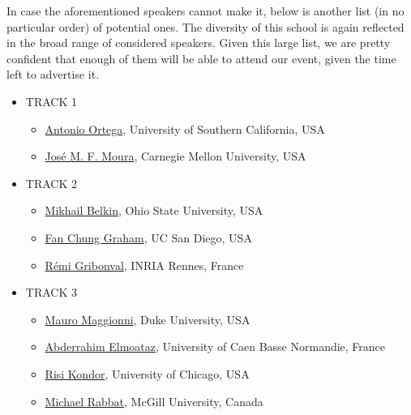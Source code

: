 \documentclass[a4paper]{scrartcl}
\begin{document}
In case the aforementioned speakers cannot make it, below is another list (in no
particular order) of potential ones. The diversity of this school is again
reflected in the broad range of considered speakers. Given this large list, we
are pretty confident that enough of them will be able to attend our event, given
the time left to advertise it.
\begin{itemize}
\setlength{\itemsep}{0pt} \setlength{\parskip}{0pt}
\item TRACK 1
	\begin{itemize}
	\setlength{\itemsep}{0pt} \setlength{\parskip}{0pt}
	\item \href{http://ee.usc.edu/faculty_staff/faculty_directory/ortega.htm}
		{Antonio Ortega}, University of Southern California, USA
	\item \href{https://users.ece.cmu.edu/~moura/}
		{José M. F. Moura}, Carnegie Mellon University, USA
	\end{itemize}
\item TRACK 2
	\begin{itemize}
	\setlength{\itemsep}{0pt} \setlength{\parskip}{0pt}
	\item \href{http://web.cse.ohio-state.edu/~mbelkin/}
		{Mikhail Belkin}, Ohio State University, USA
	\item \href{http://math.ucsd.edu/~fan/}
		{Fan Chung Graham}, UC San Diego, USA
	\item \href{http://people.irisa.fr/Remi.Gribonval/}
		{Rémi Gribonval}, INRIA Rennes, France
	\end{itemize}
\item TRACK 3
	\begin{itemize}
	\setlength{\itemsep}{0pt} \setlength{\parskip}{0pt}
	\item \href{http://services.math.duke.edu/~mauro/}
		{Mauro Maggionni}, Duke University, USA
	\item \href{https://elmoatazbill.users.greyc.fr/}
		{Abderrahim Elmoataz}, University of Caen Basse Normandie, France
	\item \href{http://people.cs.uchicago.edu/~risi/}
		{Risi Kondor}, University of Chicago, USA
	\item \href{http://www.ece.mcgill.ca/~mrabba1/}
		{Michael Rabbat}, McGill University, Canada

\end{itemize}
\end{itemize}
\end{document}
